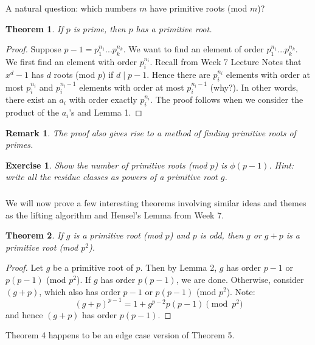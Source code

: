 \documentclass{article}
\newtheorem{theorem}{Theorem}
\newtheorem{exercise}{Exercise}
\newtheorem*{remark}{Remark}
\begin{document}
\subsubsection{}
A natural question: which numbers $m$ have primitive roots (mod $m$)?
\begin{theorem}
    If $p$ is prime, then $p$ has a primitive root.
\end{theorem}
\begin{proof}
    Suppose $p-1 = p_{1}^{n_{1}}...p_{k}^{n_{k}}$. We want to find an element of order $p_{1}^{n_{1}}...p_{k}^{n_{k}}$. We first find an element with order $p_{i}^{n_{i}}$. Recall from Week 7 Lecture Notes that $x^{d} - 1$ has $d$ roots (mod $p$) if $d \mid p-1$. Hence there are $p_{i}^{n_{i}}$ elements with order at most $p_{i}^{n_{i}}$ and $p_{i}^{n_{i}-1}$ elements with order at most $p_{i}^{n_{i}-1}$ (why?). In other words, there exist an $a_{i}$ with order exactly $p_{i}^{n_{i}}$. The proof follows when we consider the product of the $a_{i}$'s and Lemma 1.
\end{proof}

\begin{remark}
    The proof also gives rise to a method of finding primitive roots of primes.
\end{remark}

\begin{exercise}
    Show the number of primitive roots (mod $p$) is $\phi(p-1)$. Hint: write all the residue classes as powers of a primitive root $g$.
\end{exercise}

\subsubsection{}
We will now prove a few interesting theorems involving similar ideas and themes as the lifting algorithm and Hensel's Lemma from Week 7.
\begin{theorem}
        If $g$ is a primitive root (mod $p$) and $p$ is odd, then $g$ or $g + p$ is a primitive root (mod $p^{2}$).
\end{theorem}
\begin{proof}
    Let $g$ be a primitive root of $p$. Then by Lemma 2, $g$ has order $p-1$ or $p(p-1)$ (mod $p^{2}$). If $g$ has order $p(p-1)$, we are done. Otherwise, consider $(g+p)$, which also has order $p-1$ or $p(p-1)$ (mod $p^{2}$). Note:
    \begin{equation}
        (g+p)^{p-1} = 1 + g^{p-2}p(p-1) \pmod{p^{2}}
    \end{equation}
    and hence $(g+p)$ has order $p(p-1)$.
\end{proof}
Theorem 4 happens to be an edge case version of Theorem 5.
\end{document}
